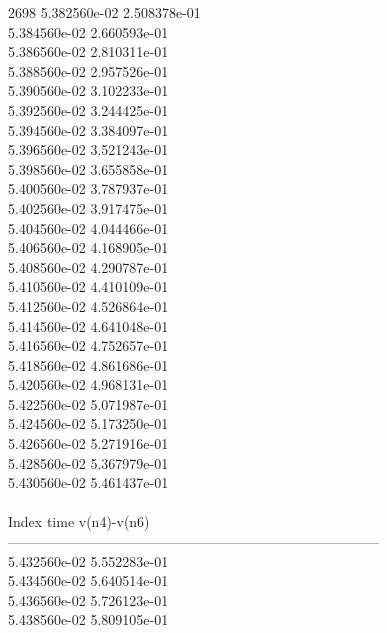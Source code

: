 2698	5.382560e-02	2.508378e-01	\\ 	5.384560e-02	2.660593e-01	\\ 	5.386560e-02	2.810311e-01	\\ 	5.388560e-02	2.957526e-01	\\ 	5.390560e-02	3.102233e-01	\\ 	5.392560e-02	3.244425e-01	\\ 	5.394560e-02	3.384097e-01	\\ 	5.396560e-02	3.521243e-01	\\ 	5.398560e-02	3.655858e-01	\\ 	5.400560e-02	3.787937e-01	\\ 	5.402560e-02	3.917475e-01	\\ 	5.404560e-02	4.044466e-01	\\ 	5.406560e-02	4.168905e-01	\\ 	5.408560e-02	4.290787e-01	\\ 	5.410560e-02	4.410109e-01	\\ 	5.412560e-02	4.526864e-01	\\ 	5.414560e-02	4.641048e-01	\\ 	5.416560e-02	4.752657e-01	\\ 	5.418560e-02	4.861686e-01	\\ 	5.420560e-02	4.968131e-01	\\ 	5.422560e-02	5.071987e-01	\\ 	5.424560e-02	5.173250e-01	\\ 	5.426560e-02	5.271916e-01	\\ 	5.428560e-02	5.367979e-01	\\ 	5.430560e-02	5.461437e-01	\\ \hline
\\ \hline
Index   time            v(n4)-v(n6)     \\ \hline
--------------------------------------------------------------------------------\\ 	5.432560e-02	5.552283e-01	\\ 	5.434560e-02	5.640514e-01	\\ 	5.436560e-02	5.726123e-01	\\ 	5.438560e-02	5.809105e-01	\\ \hline
